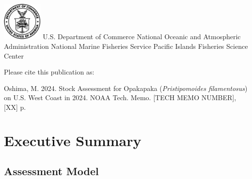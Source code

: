 \documentclass[
]{scrartcl}
\renewcommand*\contentsname{Table of contents}
\newcommand\contentsname{Table of contents}
\begin{document}
\begin{titlepage}
\begin{minipage}[b][\textheight][s]{\textwidth}
  \vspace{1\baselineskip}



  \vfill


  \vspace{1\baselineskip}

  \includegraphics[alt={},width=2cm]{support_files/us_doc_logo.png}\newline %
  U.S. Department of Commerce\newline
  National Oceanic and Atmospheric Administration\newline
  National Marine Fisheries Service\newline
  Pacific Islands Fisheries Science Center\newline

  \end{minipage}
  \restoregeometry
  \end{titlepage}

\renewcommand*\contentsname{Table of contents}
{
\hypersetup{linkcolor=}
\setcounter{tocdepth}{3}
\tableofcontents
}
\listoffigures
\listoftables

\newpage{}

Please cite this publication as:

Oshima, M. 2024. Stock Assessment for Opakapaka
(\textit{Pristipomoides filamentosus}) on U.S. West Coast in 2024. NOAA
Tech. Memo. {[}TECH MEMO NUMBER{]}, {[}XX{]} p.~

\newpage{}

\section{Executive Summary}\label{sec-exec-sum}

\subsection{Assessment Model}\label{assessment-model}
\end{document}
